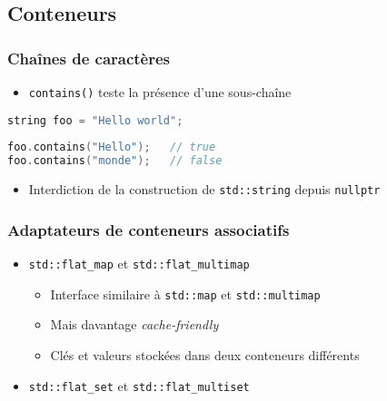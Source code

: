 \documentclass[C++.tex]{subfiles}
\begin{document}
\subsection*{Conteneurs}
\begin{frame}[fragile]
	\frametitle{Chaînes de caractères}
	\begin{itemize}
		\item \lstinline|contains()| teste la présence d'une sous-chaîne
	\end{itemize}

	\begin{lstlisting}[language=C++]
string foo = "Hello world";
	
foo.contains("Hello");   // true
foo.contains("monde");   // false\end{lstlisting}


	\begin{itemize}
		\item Interdiction de la construction de \lstinline|std::string| depuis \lstinline|nullptr|

	\end{itemize}
\end{frame}

\begin{frame}[fragile]
	\frametitle{Adaptateurs de conteneurs associatifs}
	\begin{itemize}
		\item \lstinline|std::flat_map| et \lstinline|std::flat_multimap|
		\begin{itemize}
			\item Interface similaire à \lstinline|std::map| et \lstinline|std::multimap|
			\item Mais davantage \textit{cache-friendly}
			\item Clés et valeurs stockées dans deux conteneurs différents
		\end{itemize}
		\item \lstinline|std::flat_set| et \lstinline|std::flat_multiset|
	\end{itemize}
\end{frame}
\end{document}
